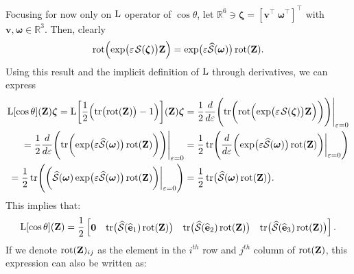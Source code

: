 Focusing for now only on $\operatorname{L}$ operator of $\cos\theta$, let $\mathbb{R}^6\ni\boldsymbol{\zeta} = [\mathbf{v}^\top\ \boldsymbol{\omega}^\top]^\top$ with $\mathbf{v}, \boldsymbol{\omega}\in\mathbb{R}^3$. Then, clearly
\begin{align}
    \rot\Bigl(\exp\bigl(\varepsilon\SL[\boldsymbol{\zeta}]\bigr)\mathbf{Z}\Bigr) = \exp\bigl(\varepsilon\widehat{\mathcal{S}}(\boldsymbol{\omega})\bigr)\rot(\mathbf{Z}). 
\end{align}
Using this result and the implicit definition of $\operatorname{L}$ through derivatives, we can express
\begin{align}
     \Lop[\cos\theta](\mathbf{Z})\boldsymbol{\zeta}=\Lop\biggl[\frac{1}{2}\Bigl(\tr\bigl(\rot(\mathbf{Z})\bigr)-1\Bigr)\biggr](\mathbf{Z})\boldsymbol{\zeta} &= \frac{1}{2}\frac{d}{d\varepsilon}\Biggl(\tr\biggl(\rot\Bigl(\exp\bigl(\varepsilon\SL[\boldsymbol{\zeta}]\bigr)\mathbf{Z}\Bigr)\biggr)\Biggr)\Biggr|_{\varepsilon=0} \nonumber\\
     = \frac{1}{2}\frac{d}{d\varepsilon}\Biggl(\tr\biggl(\exp\bigl(\varepsilon\widehat{\mathcal{S}}(\boldsymbol{\omega})\bigr)\rot(\mathbf{Z})\biggr)\Biggr)\Biggr|_{\varepsilon=0}
     &= \frac{1}{2}\tr\Biggl(\frac{d}{d\varepsilon}\biggl(\exp\bigl(\varepsilon\widehat{\mathcal{S}}(\boldsymbol{\omega})\bigr)\rot(\mathbf{Z})\biggr)\biggr|_{\varepsilon=0}\Biggr) \nonumber\\
     = \frac{1}{2}\tr\Biggl(\biggl(\widehat{\mathcal{S}}(\boldsymbol{\omega})\exp\bigl(\varepsilon\widehat{\mathcal{S}}(\boldsymbol{\omega})\bigr)\rot(\mathbf{Z})\biggr)\biggr|_{\varepsilon=0}\Biggr)
     &= \frac{1}{2}\tr\bigl(\widehat{\mathcal{S}}(\boldsymbol{\omega})\rot(\mathbf{Z})\bigr). \label{eq:appendix-L-cos-theta-implicit-defn}
\end{align}
This implies that:
\begin{align}
    \operatorname{L}[\cos\theta](\mathbf{Z}) = \frac{1}{2}\begin{bmatrix}
        \mathbf{0}& \operatorname{tr}\bigl(\widehat{\mathcal{S}}(\widehat{\mathbf{e}}_1)\operatorname{rot}(\mathbf{Z})\bigr) & \operatorname{tr}\bigl(\widehat{\mathcal{S}}(\widehat{\mathbf{e}}_2)\operatorname{rot}(\mathbf{Z})\bigr) & \operatorname{tr}\bigl(\widehat{\mathcal{S}}(\widehat{\mathbf{e}}_3)\operatorname{rot}(\mathbf{Z})\bigr)
    \end{bmatrix}.\label{eq:appendix-L-of-trace-OR-Lop-cos-theta-non-explicit}
\end{align}
If we denote $\operatorname{rot}(\mathbf{Z})_{ij}$ as the element in the $i^{th}$ row and $j^{th}$ column of $\operatorname{rot}(\mathbf{Z})$, this expression can also be written as:
